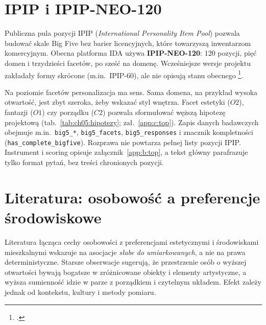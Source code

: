 \section{IPIP i IPIP-NEO-120}
\label{ch05:sec:ipip}

Publiczna pula pozycji IPIP (\emph{International Personality Item Pool}) pozwala budować skale Big Five bez barier licencyjnych, które towarzyszą inwentarzom komercyjnym.
Obecna platforma IDA używa \textbf{IPIP-NEO-120}: 120 pozycji, pięć domen i trzydzieści facetów, po sześć na domenę. Wcześniejsze wersje projektu zakładały formy skrócone (m.in.\ IPIP-60), ale nie opisują stanu obecnego \footcite{idaPlatform2026}.

Na poziomie facetów personalizacja ma sens. Sama domena, na przykład wysoka otwartość, jest zbyt szeroka, żeby wskazać styl wnętrza. Facet estetyki ($O2$), fantazji ($O1$) czy porządku ($C2$) pozwala sformułować węższą hipotezę projektową (tab.~\ref{tab:ch05:hipotezy}; zał.~\ref{app:c:top}).
Zapis danych badawczych obejmuje m.in.\ \texttt{big5\_*}, \texttt{big5\_facets}, \texttt{big5\_responses} i znacznik kompletności (\texttt{has\_complete\_bigfive}).
Rozprawa nie powtarza pełnej listy pozycji IPIP. Instrument i scoring opisuje załącznik~\ref{app:b:top}, a tekst główny parafrazuje tylko format pytań, bez treści chronionych pozycji.

\section{Literatura: osobowość a preferencje środowiskowe}
\label{ch05:sec:literatura}

Literatura łącząca cechy osobowości z preferencjami estetycznymi i środowiskami mieszkalnymi wskazuje na asocjacje \emph{słabe do umiarkowanych}, a nie na prawa deterministyczne.
Starsze obserwacje sugerują, że przestrzenie osób o wyższej otwartości bywają bogatsze w zróżnicowane obiekty i elementy artystyczne, a wyższa sumienność idzie w parze z porządkiem i czytelnym układem. Efekt zależy jednak od kontekstu, kultury i metody pomiaru.

